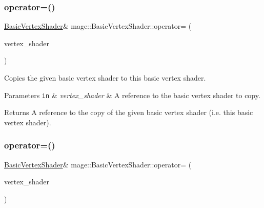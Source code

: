 \subsubsection{\texorpdfstring{operator=()}{operator=()}\hspace{0.1cm}{\footnotesize\ttfamily [1/2]}}
{\footnotesize\ttfamily \hyperlink{classmage_1_1_basic_vertex_shader}{Basic\+Vertex\+Shader}\& mage\+::\+Basic\+Vertex\+Shader\+::operator= (\begin{DoxyParamCaption}\item[{const \hyperlink{classmage_1_1_basic_vertex_shader}{Basic\+Vertex\+Shader} \&}]{vertex\+\_\+shader }\end{DoxyParamCaption})\hspace{0.3cm}{\ttfamily [delete]}}

Copies the given basic vertex shader to this basic vertex shader.


\begin{DoxyParams}[1]{Parameters}
\mbox{\tt in}  & {\em vertex\+\_\+shader} & A reference to the basic vertex shader to copy. \\
\hline
\end{DoxyParams}
\begin{DoxyReturn}{Returns}
A reference to the copy of the given basic vertex shader (i.\+e. this basic vertex shader). 
\end{DoxyReturn}
\hypertarget{classmage_1_1_basic_vertex_shader_ae5442c36b5f913ac6644cc2945a8c20a}{}\label{classmage_1_1_basic_vertex_shader_ae5442c36b5f913ac6644cc2945a8c20a} 
\subsubsection{\texorpdfstring{operator=()}{operator=()}\hspace{0.1cm}{\footnotesize\ttfamily [2/2]}}
{\footnotesize\ttfamily \hyperlink{classmage_1_1_basic_vertex_shader}{Basic\+Vertex\+Shader}\& mage\+::\+Basic\+Vertex\+Shader\+::operator= (\begin{DoxyParamCaption}\item[{\hyperlink{classmage_1_1_basic_vertex_shader}{Basic\+Vertex\+Shader} \&\&}]{vertex\+\_\+shader }\end{DoxyParamCaption})\hspace{0.3cm}{\ttfamily [delete]}}

